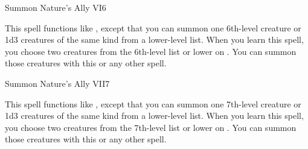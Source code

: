 \begin{spellsection}{Summon Nature's Ally VI}{6}
\begin{spellheader}
\end{spellheader}
\begin{spellcontent}
    \spelleffect This spell functions like , except that you can summon one 6th-level creature or 1d3 creatures of the same kind from a lower-level list. When you learn this spell, you choose two creatures from the 6th-level list or lower on . You can summon those creatures with this or any other  spell.
    \spelldur \durshort \dismissable
\end{spellcontent}
\begin{spellfooter}
\end{spellfooter}
\end{spellsection}

\begin{spellsection}{Summon Nature's Ally VII}{7}
\begin{spellheader}
\end{spellheader}
\begin{spellcontent}
    \spelleffect This spell functions like , except that you can summon one 7th-level creature or 1d3 creatures of the same kind from a lower-level list. When you learn this spell, you choose two creatures from the 7th-level list or lower on . You can summon those creatures with this or any other  spell.
    \spelldur \durshort \dismissable
\end{spellcontent}
\begin{spellfooter}
\end{spellfooter}
\end{spellsection}

